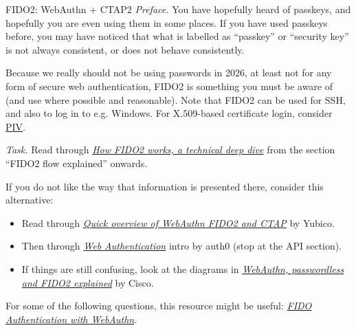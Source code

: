\documentclass{homework}
\begin{document}
\begin{task}{FIDO2: WebAuthn + CTAP2}
  \textit{Preface.}
  You have hopefully heard of passkeys, and hopefully you are even using them in some places.
  If you have used passkeys before, you may have noticed that what is labelled as \enquote{passkey} or \enquote{security key} is not always consistent, or does not behave consistently.

  Because we really should not be using passwords in 2026, at least not for any form of secure web authentication, FIDO2 is something you must be aware of (and use where possible and reasonable).
  Note that FIDO2 can be used for SSH, and also to log in to e.g. Windows.
  For X.509-based certificate login, consider \href{https://www.idmanagement.gov/university/piv/}{PIV}.

  \textit{Task.}
  Read through \href{https://michaelwaterman.nl/2025/04/02/how-fido2-works-a-technical-deep-dive/}{\textit{How FIDO2 works, a technical deep dive}} from the section \enquote{FIDO2 flow explained} onwards.
  
  If you do not like the way that information is presented there, consider this alternative:
  \begin{itemize}
    \item Read through \href{https://developers.yubico.com/Passkeys/Quick_overview_of_WebAuthn_FIDO2_and_CTAP.html}{\textit{Quick overview of WebAuthn FIDO2 and CTAP}} by Yubico.
    \item Then through \href{https://www.webauthn.me/introduction}{\textit{Web Authentication}} intro by auth0 (stop at the API section).
    \item If things are still confusing, look at the diagrams in \href{https://duo.com/blog/webauthn-passwordless-fido2-explained-componens-passwordless-architecture}{\textit{WebAuthn, passwordless and FIDO2 explained}} by Cisco.
  \end{itemize}

  For some of the following questions, this resource might be useful: \href{https://auth0.com/docs/secure/multi-factor-authentication/fido-authentication-with-webauthn}{\textit{FIDO Authentication with WebAuthn}}.


\end{task}
\end{document}
